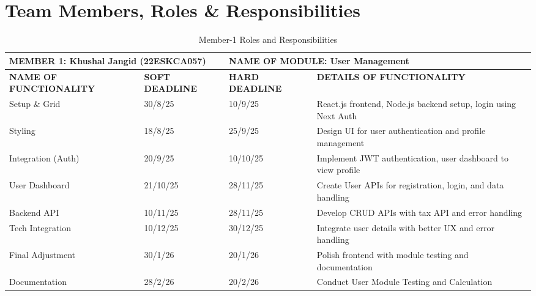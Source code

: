 \section{Team Members, Roles \& Responsibilities}
\begin{table}[H]
\begin{center}
 \begin{tabular}{| m{4cm} | m{2.5cm} | m{2.5cm}| m{5cm}| } 
\hline
\multicolumn{2}{|l|}{MEMBER 1: Khushal Jangid (22ESKCA057)}&
\multicolumn{2}{|l|}{NAME OF MODULE: User Management}\\
\hline
\textbf{NAME OF FUNCTIONALITY} & \textbf{SOFT DEADLINE} & \textbf{HARD DEADLINE} & \textbf{DETAILS OF FUNCTIONALITY} \\ 
\hline
Setup \& Grid & 30/8/25 & 10/9/25 & React.js frontend, Node.js backend setup, login using Next Auth \\
\hline
Styling & 18/8/25 & 25/9/25 & Design UI for user authentication and profile management \\
\hline
Integration (Auth) & 20/9/25 & 10/10/25 & Implement JWT authentication, user dashboard to view profile \\
\hline
User Dashboard & 21/10/25 & 28/11/25 & Create User APIs for registration, login, and data handling \\
\hline
Backend API & 10/11/25 & 28/11/25 & Develop CRUD APIs with tax API and error handling \\
\hline
Tech Integration & 10/12/25 & 30/12/25 & Integrate user details with better UX and error handling \\
\hline
Final Adjustment & 30/1/26 & 20/1/26 & Polish frontend with module testing and documentation \\
\hline
Documentation & 28/2/26 & 20/2/26 & Conduct User Module Testing and Calculation \\
\hline
\end{tabular}
\caption{Member-1 Roles and Responsibilities}
\end{center}
\end{table}

